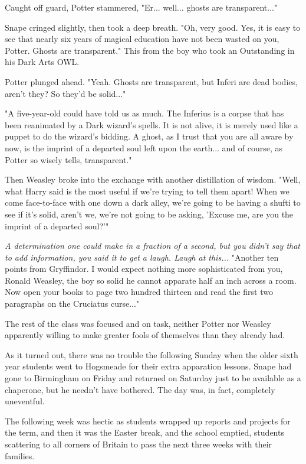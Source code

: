 \documentclass[a4paper,11pt]{article}
\begin{document}
Caught off guard, Potter stammered, "Er... well... ghosts are transparent..."

Snape cringed slightly, then took a deep breath. "Oh, very good. Yes, it is easy to see that nearly six years of magical education have not been wasted on you, Potter. Ghosts are transparent." This from the boy who took an Outstanding in his Dark Arts OWL.

Potter plunged ahead. "Yeah. Ghosts are transparent, but Inferi are dead bodies, aren't they? So they'd be solid..."

"A five-year-old could have told us as much. The Inferius is a corpse that has been reanimated by a Dark wizard's spells. It is not alive, it is merely used like a puppet to do the wizard's bidding. A ghost, as I trust that you are all aware by now, is the imprint of a departed soul left upon the earth... and of course, as Potter so wisely tells, transparent."

Then Weasley broke into the exchange with another distillation of wisdom. "Well, what Harry said is the most useful if we're trying to tell them apart! When we come face-to-face with one down a dark alley, we're going to be having a shufti to see if it's solid, aren't we, we're not going to be asking, 'Excuse me, are you the imprint of a departed soul?'"

\emph{A determination one could make in a fraction of a second, but you didn't say that to add information, you said it to get a laugh. Laugh at this...} "Another ten points from Gryffindor. I would expect nothing more sophisticated from you, Ronald Weasley, the boy so solid he cannot apparate half an inch across a room. Now open your books to page two hundred thirteen and read the first two paragraphs on the Cruciatus curse..."

The rest of the class was focused and on task, neither Potter nor Weasley apparently willing to make greater fools of themselves than they already had.

As it turned out, there was no trouble the following Sunday when the older sixth year students went to Hogsmeade for their extra apparation lessons. Snape had gone to Birmingham on Friday and returned on Saturday just to be available as a chaperone, but he needn't have bothered. The day was, in fact, completely uneventful.

The following week was hectic as students wrapped up reports and projects for the term, and then it was the Easter break, and the school emptied, students scattering to all corners of Britain to pass the next three weeks with their families.
\end{document}
